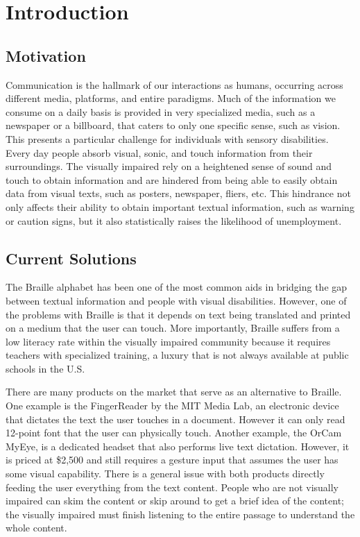 \chapter{Introduction}

\section{Motivation}

Communication is the hallmark of our interactions as humans, occurring across different media, platforms, and entire paradigms. Much of the information we consume on a daily basis is provided in very specialized media, such as a newspaper or a billboard, that caters to only one specific sense, such as vision. This presents a particular challenge for individuals with sensory disabilities. Every day people absorb visual, sonic, and touch information from their surroundings. The visually impaired rely on a heightened sense of sound and touch to obtain information and are hindered from being able to easily obtain data from visual texts, such as posters, newspaper, fliers, etc. This hindrance not only affects their ability to obtain important textual information, such as warning or caution signs, but it also statistically raises the likelihood of unemployment.

\section{Current Solutions}

The Braille alphabet has been one of the most common aids in bridging the gap between textual information and people with visual disabilities. However, one of the problems with Braille is that it depends on text being translated and printed on a medium that the user can touch. More importantly, Braille suffers from a low literacy rate within the visually impaired community because it requires teachers with specialized training, a luxury that is not always available at public schools in the U.S.
	
There are many products on the market that serve as an alternative to Braille. One example is the FingerReader by the MIT Media Lab, an electronic device that dictates the text the user touches in a document. However it can only read 12-point font that the user can physically touch. Another example, the OrCam MyEye, is a dedicated headset that also performs live text dictation. However, it is priced at \$2,500 and still requires a gesture input that assumes the user has some visual capability. There is a general issue with both products directly feeding the user everything from the text content. People who are not visually impaired can skim the content or skip around to get a brief idea of the content; the visually impaired must finish listening to the entire passage to understand the whole content.

